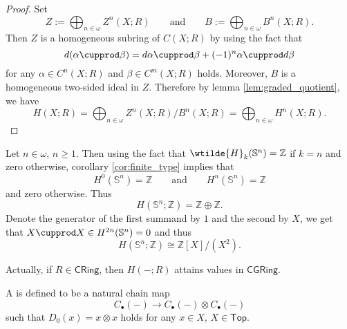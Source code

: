 \begin{proof}
	Set
	\begin{equation*}
		Z := \bigoplus_{n \in \omega} Z^n(X;R) \qquad \text{and} \qquad B := \bigoplus_{n \in \omega} B^n(X;R).
	\end{equation*}
	Then $Z$ is a homogeneous subring of $C(X;R)$ by using the fact that
	\begin{equation*}
		d(\alpha \cupprod \beta) = d\alpha \cupprod \beta + (-1)^n \alpha \cupprod d\beta
	\end{equation*}
	\noindent for any $\alpha \in C^n(X;R)$ and $\beta \in C^m(X;R)$ holds. Moreover, $B$ is a homogeneous two-sided ideal in $Z$. Therefore by lemma \ref{lem:graded_quotient}, we have 
	\begin{equation*}
		H(X;R) = \bigoplus_{n \in \omega} Z^n(X;R)/B^n(X;R) = \bigoplus_{n \in \omega} H^n(X;R).
	\end{equation*}
\end{proof}

\begin{example}
	\label{ex:cohomology_ring_sphere}
	Let $n \in \omega$, $n \geq 1$. Then using the fact that $\wtilde{H}_k(\mathbb{S}^n) = \mathbb{Z}$ if $k = n$ and zero otherwise, corollary \ref{cor:finite_type} implies that
	\begin{equation*}
		H^0(\mathbb{S}^n) = \mathbb{Z} \qquad \text{and} \qquad H^n(\mathbb{S}^n) = \mathbb{Z}
	\end{equation*}
	\noindent and zero otherwise. Thus
	\begin{equation*}
		H(\mathbb{S}^n;\mathbb{Z}) = \mathbb{Z} \oplus \mathbb{Z}.
	\end{equation*}
	Denote the generator of the first summand by $1$ and the second by $X$, we get that $X \cupprod X \in H^{2n}(\mathbb{S}^n) = 0$ and thus 
	\begin{equation*}
		H(\mathbb{S}^n;\mathbb{Z}) \cong \mathbb{Z}[X]/(X^2).
	\end{equation*}
\end{example}

Actually, if $R \in \mathsf{CRing}$, then $H(-;R)$ attains values in $\mathsf{CGRing}$.

\begin{definition}
	A  is defined to be a natural chain map
	\begin{equation*}
		C_\bullet(-) \to C_\bullet(-) \otimes C_\bullet(-)
	\end{equation*}
	\noindent such that $D_0(x) = x \otimes x$ holds for any $x \in X$, $X \in \mathsf{Top}$.
\end{definition}

